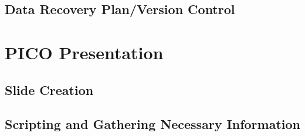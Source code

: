\documentclass{article}
\begin{document}
\subsection{Data Recovery Plan/Version Control}




\section{PICO Presentation}

\subsection{Slide Creation}



\subsection{Scripting and Gathering Necessary Information}
\end{document}
